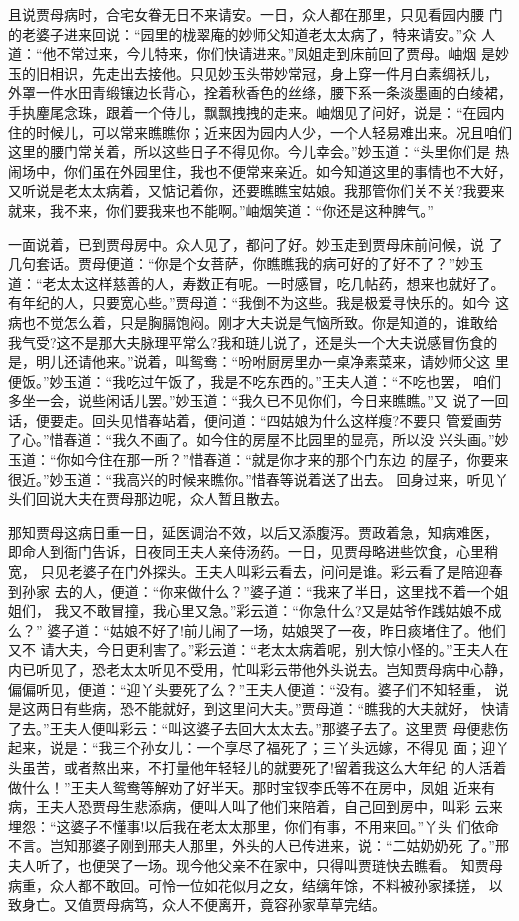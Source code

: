 且说贾母病时，合宅女眷无日不来请安。一日，众人都在那里，只见看园内腰
门的老婆子进来回说：“园里的栊翠庵的妙师父知道老太太病了，特来请安。”众
人道：“他不常过来，今儿特来，你们快请进来。”凤姐走到床前回了贾母。岫烟
是妙玉的旧相识，先走出去接他。只见妙玉头带妙常冠，身上穿一件月白素绸袄儿，
外罩一件水田青缎镶边长背心，拴着秋香色的丝绦，腰下系一条淡墨画的白绫裙，
手执麈尾念珠，跟着一个侍儿，飘飘拽拽的走来。岫烟见了问好，说是：“在园内
住的时候儿，可以常来瞧瞧你；近来因为园内人少，一个人轻易难出来。况且咱们
这里的腰门常关着，所以这些日子不得见你。今儿幸会。”妙玉道：“头里你们是
热闹场中，你们虽在外园里住，我也不便常来亲近。如今知道这里的事情也不大好，
又听说是老太太病着，又惦记着你，还要瞧瞧宝姑娘。我那管你们关不关?我要来
就来，我不来，你们要我来也不能啊。”岫烟笑道：“你还是这种脾气。”

一面说着，已到贾母房中。众人见了，都问了好。妙玉走到贾母床前问候，说
了几句套话。贾母便道：“你是个女菩萨，你瞧瞧我的病可好的了好不了？”妙玉
道：“老太太这样慈善的人，寿数正有呢。一时感冒，吃几帖药，想来也就好了。
有年纪的人，只要宽心些。”贾母道：“我倒不为这些。我是极爱寻快乐的。如今
这病也不觉怎么着，只是胸膈饱闷。刚才大夫说是气恼所致。你是知道的，谁敢给
我气受?这不是那大夫脉理平常么?我和琏儿说了，还是头一个大夫说感冒伤食的
是，明儿还请他来。”说着，叫鸳鸯：“吩咐厨房里办一桌净素菜来，请妙师父这
里便饭。”妙玉道：“我吃过午饭了，我是不吃东西的。”王夫人道：“不吃也罢，
咱们多坐一会，说些闲话儿罢。”妙玉道：“我久已不见你们，今日来瞧瞧。”又
说了一回话，便要走。回头见惜春站着，便问道：“四姑娘为什么这样瘦?不要只
管爱画劳了心。”惜春道：“我久不画了。如今住的房屋不比园里的显亮，所以没
兴头画。”妙玉道：“你如今住在那一所？”惜春道：“就是你才来的那个门东边
的屋子，你要来很近。”妙玉道：“我高兴的时候来瞧你。”惜春等说着送了出去。
回身过来，听见丫头们回说大夫在贾母那边呢，众人暂且散去。

那知贾母这病日重一日，延医调治不效，以后又添腹泻。贾政着急，知病难医，
即命人到衙门告诉，日夜同王夫人亲侍汤药。一日，见贾母略进些饮食，心里稍宽，
只见老婆子在门外探头。王夫人叫彩云看去，问问是谁。彩云看了是陪迎春到孙家
去的人，便道：“你来做什么？”婆子道：“我来了半日，这里找不着一个姐姐们，
我又不敢冒撞，我心里又急。”彩云道：“你急什么?又是姑爷作践姑娘不成么？”
婆子道：“姑娘不好了!前儿闹了一场，姑娘哭了一夜，昨日痰堵住了。他们又不
请大夫，今日更利害了。”彩云道：“老太太病着呢，别大惊小怪的。”王夫人在
内已听见了，恐老太太听见不受用，忙叫彩云带他外头说去。岂知贾母病中心静，
偏偏听见，便道：“迎丫头要死了么？”王夫人便道：“没有。婆子们不知轻重，
说是这两日有些病，恐不能就好，到这里问大夫。”贾母道：“瞧我的大夫就好，
快请了去。”王夫人便叫彩云：“叫这婆子去回大太太去。”那婆子去了。这里贾
母便悲伤起来，说是：“我三个孙女儿：一个享尽了福死了；三丫头远嫁，不得见
面；迎丫头虽苦，或者熬出来，不打量他年轻轻儿的就要死了!留着我这么大年纪
的人活着做什么！”王夫人鸳鸯等解劝了好半天。那时宝钗李氏等不在房中，凤姐
近来有病，王夫人恐贾母生悲添病，便叫人叫了他们来陪着，自己回到房中，叫彩
云来埋怨：“这婆子不懂事!以后我在老太太那里，你们有事，不用来回。”丫头
们依命不言。岂知那婆子刚到邢夫人那里，外头的人已传进来，说：“二姑奶奶死
了。”邢夫人听了，也便哭了一场。现今他父亲不在家中，只得叫贾琏快去瞧看。
知贾母病重，众人都不敢回。可怜一位如花似月之女，结缡年馀，不料被孙家揉搓，
以致身亡。又值贾母病笃，众人不便离开，竟容孙家草草完结。


